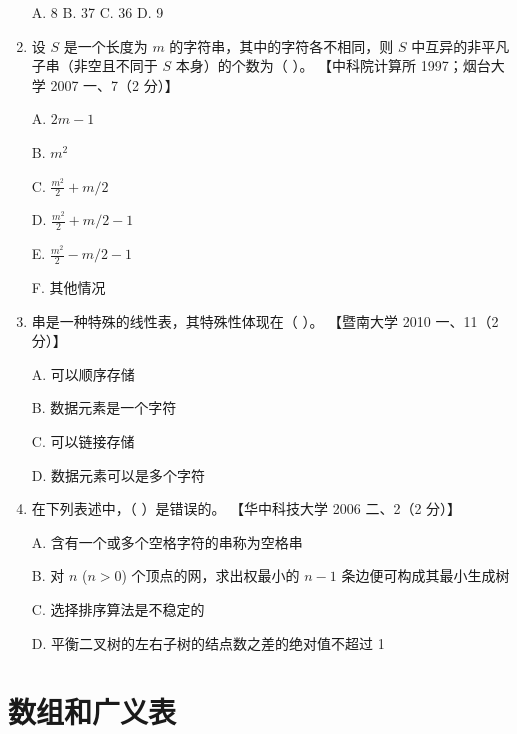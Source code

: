 \documentclass[lang=cn,newtx,10pt,scheme=chinese]{elegantbook}
\begin{document}
\begin{enumerate}
       A. 8 \quad B. 37 \quad C. 36 \quad D. 9  
   
       \item 设 $S$ 是一个长度为 $m$ 的字符串，其中的字符各不相同，则 $S$ 中互异的非平凡子串（非空且不同于 $S$ 本身）的个数为（ ）。  
       【中科院计算所 1997；烟台大学 2007 一、7（2 分）】  

       A. $2m - 1$  

       B. $m^2$  

       C. $\frac{m^2}{2} + m/2$  

       D. $\frac{m^2}{2} + m/2 - 1$  

       E. $\frac{m^2}{2} - m/2 - 1$  

       F. 其他情况  
   
       \item 串是一种特殊的线性表，其特殊性体现在（ ）。  
       【暨南大学 2010 一、11（2 分）】  

       A. 可以顺序存储  

       B. 数据元素是一个字符  

       C. 可以链接存储  

       D. 数据元素可以是多个字符  
   
       \item 在下列表述中，（ ）是错误的。  
       【华中科技大学 2006 二、2（2 分）】  


       A. 含有一个或多个空格字符的串称为空格串  

       B. 对 $n$ ($n > 0$) 个顶点的网，求出权最小的 $n-1$ 条边便可构成其最小生成树  

       C. 选择排序算法是不稳定的  

       D. 平衡二叉树的左右子树的结点数之差的绝对值不超过 1  
\end{enumerate}

\chapter{数组和广义表}
\end{document}
